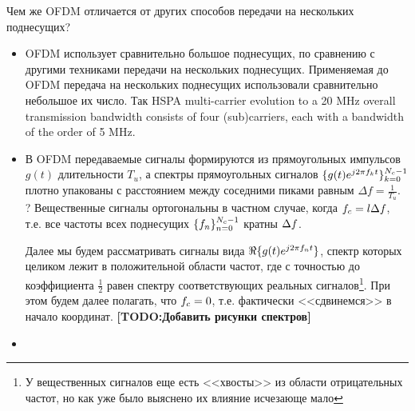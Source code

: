 \documentclass{book}
\numberwithin{theorem}{chapter}
\numberwithin{statement}{chapter}
\numberwithin{lemma}{chapter}
\theoremstyle{definition}
\numberwithin{task}{chapter}
\theoremstyle{remark}
\numberwithin{example}{chapter}
\theoremstyle{definition}
\numberwithin{definition}{chapter}
\theoremstyle{remark}
\theoremstyle{remark}
\numberwithin{lyrics}{section}
\newcommand{\TODO}[1]{\textbf{[TODO:#1]}}
\begin{document}
Чем же OFDM отличается от других способов передачи на нескольких поднесущих?
\begin{itemize}
\item OFDM использует сравнительно большое поднесущих, по сравнению с другими техниками передачи на нескольких поднесущих. Применяемая до OFDM передача на нескольких поднесущих использовали сравнительно небольшое их число. Так HSPA multi-carrier evolution to a 20 MHz overall transmission bandwidth consists of four (sub)carriers, each with a bandwidth of the order of 5 MHz.
\item В OFDM передаваемые сигналы формируются из прямоугольных импульсов $g(t)$ длительности $T_u$, а спектры прямоугольных сигналов $\{g(t)e^{j2\pi f_k t}\}_{k=0}^{N_c-1}$ плотно упакованы с расстоянием между соседними пиками равным $\Delta f = \frac{1}{T_u}$. ? Вещественные сигналы ортогональны в частном случае, когда $f_c = l \Delta f$, т.е. все частоты всех поднесущих $\{f_n\}_{n = 0}^{N_c - 1}$ кратны $\Delta f$. 


Далее мы будем рассматривать сигналы вида $\Re\{g(t)e^{j2\pi f_n t}\}$, спектр которых целиком лежит в положительной области частот, где с точностью до коэффициента $\frac{1}{2}$ равен спектру соответствующих реальных сигналов\footnote{У вещественных сигналов еще есть <<хвосты>> из области отрицательных частот, но как уже было выяснено их влияние исчезающе мало}. При этом будем далее полагать, что $f_c = 0$, т.е. фактически <<сдвинемся>> в начало координат. \TODO{Добавить рисунки спектров} 


\item
\end{itemize}
\end{document}

